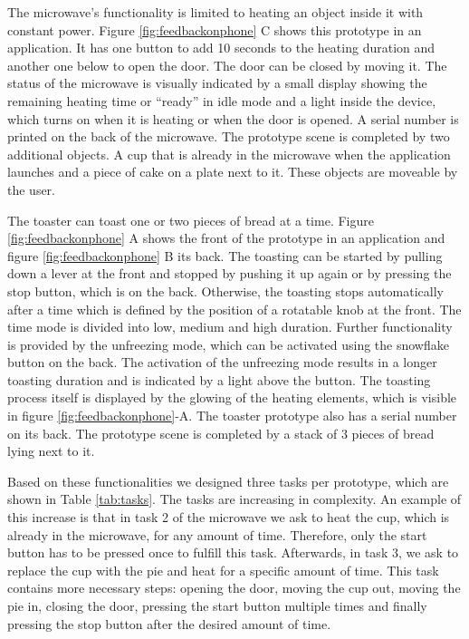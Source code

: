 \documentclass[11pt, a4paper]{article}
\begin{document}
			The microwave's functionality is limited to heating an object inside it with constant power. Figure \ref{fig:feedbackonphone} C shows this prototype in an application. It has one button to add 10 seconds to the heating duration and another one below to open the door. The door can be closed by moving it. The status of the microwave is visually indicated by a small display showing the remaining heating time or ``ready'' in idle mode and a light inside the device, which turns on when it is heating or when the door is opened. A serial number is printed on the back of the microwave. The prototype scene is completed by two additional objects. A cup that is already in the microwave when the application launches and a piece of cake on a plate next to it. These objects are moveable by the user.

			The toaster can toast one or two pieces of bread at a time. Figure \ref{fig:feedbackonphone} A shows the front of the prototype in an application and figure \ref{fig:feedbackonphone} B its back. The toasting can be started by pulling down a lever at the front and stopped by pushing it up again or by pressing the stop button, which is on the back. Otherwise, the toasting stops automatically after a time which is defined by the position of a rotatable knob at the front. The time mode is divided into low, medium and high duration. Further functionality is provided by the unfreezing mode, which can be activated using the snowflake button on the back. The activation of the unfreezing mode results in a longer toasting duration and is indicated by a light above the button. The toasting process itself is displayed by the glowing of the heating elements, which is visible in figure \ref{fig:feedbackonphone}-A. The toaster prototype also has a serial number on its back. The prototype scene is completed by a stack of 3 pieces of bread lying next to it. 
			
			Based on these functionalities we designed three tasks per prototype, which are shown in Table \ref{tab:tasks}. The tasks are increasing in complexity. An example of this increase is that in task 2 of the microwave we ask to heat the cup, which is already in the microwave, for any amount of time. Therefore, only the start button has to be pressed once to fulfill this task. Afterwards, in task 3, we ask to replace the cup with the pie and heat for a specific amount of time. This task contains more necessary steps: opening the door, moving the cup out, moving the pie in, closing the door, pressing the start button multiple times and finally pressing the stop button after the desired amount of time.
\end{document}
